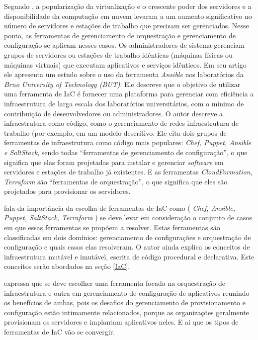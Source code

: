\hfill

Segundo , a popularização da virtualização e o crescente poder dos servidores e a disponibilidade da computação em nuvem levaram a um aumento significativo no número de servidores e estações de trabalho que precisam ser gerenciados. Nesse ponto, as ferramentas de gerenciamento de orquestração e gerenciamento de configuração se aplicam nesses casos. Os administradores de sistema gerenciam grupos de servidores ou estações de trabalho idênticas (máquinas físicas ou máquinas virtuais) que executam aplicativos e serviços idênticos. Em seu artigo ele apresenta um estudo sobre o uso da ferramenta \textit{Ansible} nos laboratórios da \textit{Brno University of Technology (BUT)}. Ele descreve que o objetivo de utilizar uma ferramenta de IaC é fornecer uma plataforma para gerenciar com eficiência a infraestrutura de larga escala dos laboratórios universitários, com o mínimo de contribuição de desenvolvedores ou administradores.
O autor descreve a infraestrutura como código, como o gerenciamento de redes infraestrutura de trabalho (por exemplo,  em um modelo descritivo. Ele cita dois grupos de ferramentas de infraestrutura como código mais populares: \textit{Chef, Puppet, Ansible e SaltStack}, sendo todas “ferramentas de gerenciamento de configuração”, o que significa que elas foram projetadas para instalar e gerenciar \textit{software} em servidores e estações de trabalho já existentes. E as ferramentas \textit{CloudFormation, Terraform} são “ferramentas de orquestração”, o que significa que eles são projetados para provisionar os servidores.

\hfill

  fala da importância da escolha de ferramentas de IaC como (\textit{ Chef, Ansible, Puppet, SaltStack, Terraform }) se deve levar em consideração o conjunto de casos em que essas ferramentas se propõem a resolver. Estas ferramentas são classificadas em dois domínios: gerenciamento de configurações e orquestração de configuração e quais casos elas resolveram. O autor ainda explica os conceitos de infraestrutura mutável e imutável, escrita de código procedural e declarativa. Este conceitos serão abordados na seção \ref{IaC}. 

 expressa que se deve escolher uma ferramenta focada na orquestração de infraestrutura e outra em gerenciamento de configuração de aplicativos reunindo os benefícios de ambas, pois os desafios do gerenciamento de provisionamento e configuração estão intimamente relacionados, porque as organizações geralmente provisionam os servidores e implantam aplicativos neles. E ai que os tipos de ferramentas de IaC vão se convergir.   

